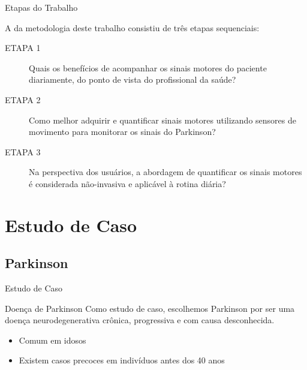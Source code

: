 \documentclass{beamer}
\begin{document}
\begin{frame}{Etapas do Trabalho}
	\begin{block}{}
	  A da metodologia deste trabalho consistiu de três etapas sequenciais:
		  \begin{description}
		  \item[ETAPA 1] Quais os benefícios de acompanhar os sinais motores do paciente diariamente, do ponto de vista do profissional da saúde?
		  \item[ETAPA 2] Como melhor adquirir e quantificar sinais motores utilizando sensores de movimento para monitorar os sinais do Parkinson?
		  \item[ETAPA 3] Na perspectiva dos usuários, a abordagem de quantificar os sinais motores é considerada não-invasiva e aplicável à rotina diária?
		  \end{description}
	\end{block}
\end{frame}

\section{Estudo de Caso}
\subsection{Parkinson}
\begin{frame}{Estudo de Caso}
  \begin{block}{Doença de Parkinson}
   Como estudo de caso, escolhemos Parkinson por ser uma doença neurodegenerativa crônica, progressiva e com causa desconhecida. 
   \begin{itemize}
    \item Comum em idosos
    \item Existem casos precoces em indivíduos antes dos 40 anos
   \end{itemize}
  \end{block}
\end{frame}
\end{document}
